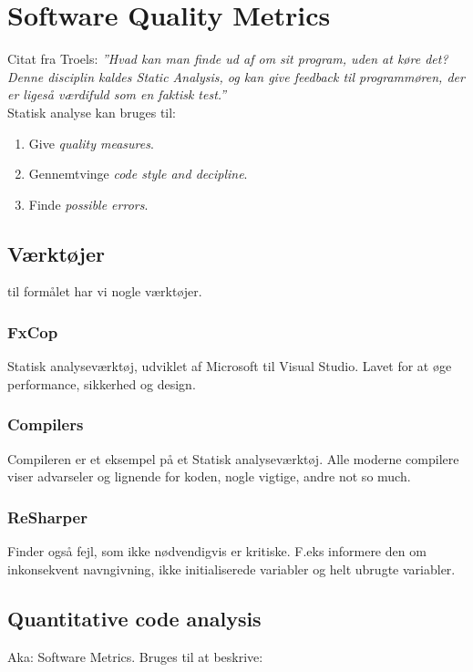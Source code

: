\section{Software Quality Metrics}
Citat fra Troels: \textit{''Hvad kan man finde ud af om sit program, uden at køre det? Denne disciplin kaldes Static Analysis, og kan give feedback til programmøren, der er ligeså værdifuld som en faktisk test.''}\\

Statisk analyse kan bruges til: 

\begin{enumerate}
	\item Give \textit{quality measures}.
	\item Gennemtvinge \textit{code style and decipline}.
	\item Finde \textit{possible errors}.
\end{enumerate}

\subsection{Værktøjer} til formålet har vi nogle værktøjer.

\subsubsection{FxCop}
Statisk analyseværktøj, udviklet af Microsoft til Visual Studio. Lavet for at øge performance, sikkerhed og design.

\subsubsection{Compilers}
Compileren er et eksempel på et Statisk analyseværktøj. Alle moderne compilere viser advarseler og lignende for koden, nogle vigtige, andre not so much.

\subsubsection{ReSharper}
Finder også fejl, som ikke nødvendigvis er kritiske. F.eks informere den om inkonsekvent navngivning, ikke initialiserede variabler og helt ubrugte variabler.

\subsection{Quantitative code analysis}
Aka: Software Metrics. Bruges til at beskrive: 

